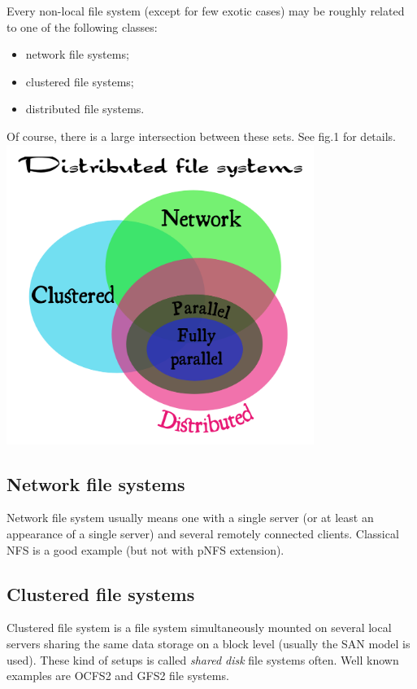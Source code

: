 \documentclass[10pt, a5paper]{article}
\begin{document}
Every non-local file system (except for few exotic cases) may be roughly related to one of the following classes:

\begin{itemize}
  \item network file systems;
  \item clustered file systems;
  \item distributed file systems.
\end{itemize}

Of course, there is a large intersection between these sets. See fig.1 for details.
\includegraphics[width=10cm]{123_genesis.png}

\subsection*{Network file systems}

Network file system usually means one with a single server (or at least an appearance of a single server) and several remotely connected clients. Classical NFS\cite{bib3} is a good example (but not with pNFS\cite{bib4} extension).

\subsection*{Clustered file systems}

Clustered file system is a file system simultaneously mounted on several local servers sharing the same data storage on a block level (usually the SAN\cite{bib5} model is used). These kind of setups is called \emph{shared disk} file systems often. Well known examples are OCFS2\cite{bib6} and GFS2\cite{bib7} file systems.
\end{document}
